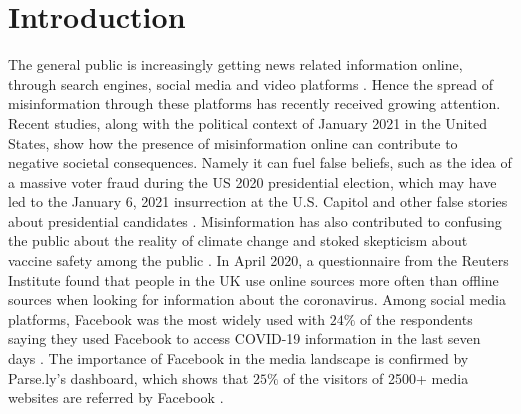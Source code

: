 \documentclass[review]{elsarticle}
\begin{document}
\linenumbers

\section{Introduction}

The general public is increasingly getting news related information online, through search engines, social media and video platforms \citep{mitchell2016modern}.
Hence the spread of misinformation through these platforms has recently received growing attention.
Recent studies, along with the political context of January 2021 in the United States, show how the presence of misinformation online can contribute to negative societal consequences.
Namely it can fuel false beliefs, such as the idea of a massive voter fraud during the US 2020 presidential election, which may have led to the January 6, 2021 insurrection at the U.S. Capitol \citep{benkler2020mail} and other false stories about presidential candidates \citep{allcott2017social}. 
Misinformation has also contributed to confusing the public about the reality of climate change \citep{brulle30years, porter2019can} and stoked skepticism about vaccine safety among the public \citep{featherstone2020feeling, lahouati2020spread, pierri2021impact}. 
In April 2020, a questionnaire from the Reuters Institute found that people in the UK use online sources more often than offline sources when looking for information about the coronavirus. 
Among social media platforms, Facebook was the most widely used with $24\%$ of the respondents saying they used Facebook to access COVID-19 information in the last seven days \citep{fletcher2020information}.
The importance of Facebook in the media landscape is confirmed by Parse.ly’s dashboard, which shows that $25\%$ of the visitors of 2500+ media websites are referred by Facebook \citep{parslyDashboard}.
\end{document}
